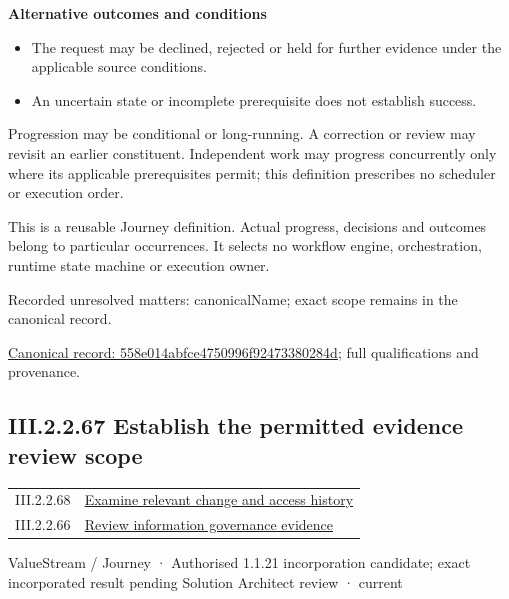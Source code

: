 \par\medskip\textbf{Alternative outcomes and conditions}\par


\begin{itemize}


\item The request may be declined, rejected or held for further evidence under the applicable source conditions.

\item An uncertain state or incomplete prerequisite does not establish success.

\end{itemize}


Progression may be conditional or long-running. A correction or review may revisit an earlier constituent. Independent work may progress concurrently only where its applicable prerequisites permit; this definition prescribes no scheduler or execution order.



This is a reusable Journey definition. Actual progress, decisions and outcomes belong to particular occurrences. It selects no workflow engine, orchestration, runtime state machine or execution owner.


{\small Recorded unresolved matters: canonicalName; exact scope remains in the canonical record.}\par
{\footnotesize \href{../../../../../../../continuum/strategy/value-stream/558e014abfce4750996f92473380284d.md}{Canonical record: 558e014abfce4750996f92473380284d}; full qualifications and provenance.}\par
\subsection*{III.2.2.67 Establish the permitted evidence review scope}
\label{navigation:III.2.2.67}

\begin{longtable}{p{.22\linewidth}p{.73\linewidth}}
III.2.2.68 & \hyperref[element:39211c37cd3c4d3a8cdfe49d044c7f43]{Examine relevant change and access history} \\
III.2.2.66 & \hyperref[element:558e014abfce4750996f92473380284d]{Review information governance evidence} \\
\end{longtable}
\label{element:88a66a2803c04a93a157a19d05297bee}
{\small ValueStream / Journey · Authorised 1.1.21 incorporation candidate; exact incorporated result pending Solution Architect review · current}\par

